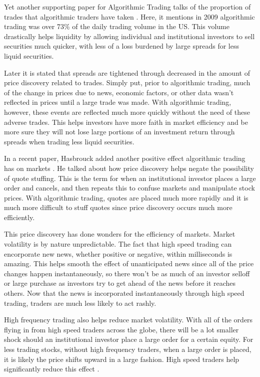 \documentclass[11pt,]{article}
\begin{document}
Yet another supporting paper for Algorithmic Trading talks of the
proportion of trades that algorithmic traders have taken
\citet{hendershott2011does}. Here, it mentions in 2009 algorithmic
trading was over 73\% of the daily trading volume in the US. This volume
drastically helps liquidity by allowing individual and institutional
investors to sell securities much quicker, with less of a loss burdened
by large spreads for less liquid securities.

Later it is stated that spreads are tightened through decreased in the
amount of price discovery related to trades. Simply put, prior to
algorithmic trading, much of the change in prices due to news, economic
factors, or other data wasn't reflected in prices until a large trade
was made. With algorithmic trading, however, these events are reflected
much more quickly without the need of these adverse trades. This helps
investors have more faith in market efficiency and be more sure they
will not lose large portions of an investment return through spreads
when trading less liquid securities.

In a recent paper, Hasbrouck added another positive effect algorithmic
trading has on markets \citet{hasbrouck2018high}. He talked about how
price discovery helps negate the possibility of quote stuffing. This is
the term for when an institutional investor places a large order and
cancels, and then repeats this to confuse markets and manipulate stock
prices. With algorithmic trading, quotes are placed much more rapidly
and it is much more difficult to stuff quotes since price discovery
occurs much more efficiently.

This price discovery has done wonders for the efficiency of markets.
Market volatility is by nature unpredictable. The fact that high speed
trading can encorporate new news, whether positive or negative, within
milliseconds is amazing. This helps smooth the effect of unanticipated
news since all of the price changes happen instantaneously, so there
won't be as much of an investor selloff or large purchase as investors
try to get ahead of the news before it reaches others. Now that the news
is incorporated instantaneously through high speed trading, traders are
much less likely to act rashly.

High frequency trading also helps reduce market volatility. With all of
the orders flying in from high speed traders across the globe, there
will be a lot smaller shock should an institutional investor place a
large order for a certain equity. For less trading stocks, without high
frequency traders, when a large order is placed, it is likely the price
shifts upward in a large fashion. High speed traders help significantly
reduce this effect \citet{zhang2010high}.
\end{document}

